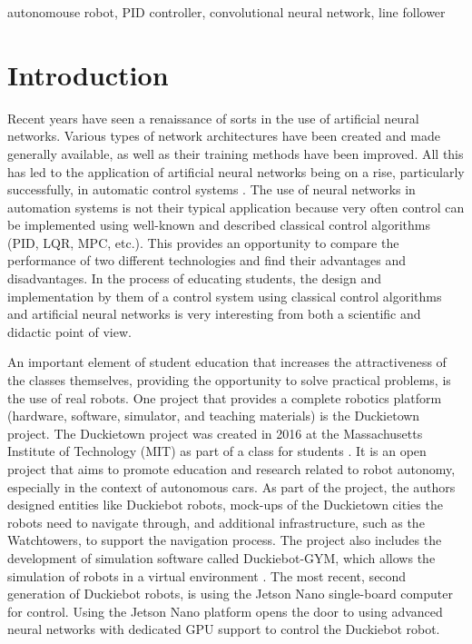 \documentclass[conference]{IEEEtran}
\begin{document}
\begin{IEEEkeywords}
autonomouse robot, PID controller, convolutional neural network, line follower
\end{IEEEkeywords}
%
\section{Introduction}
Recent years have seen a renaissance of sorts in the use of artificial neural networks. Various types of network architectures have been created and made generally available, as well as their training methods have been improved. All this has led to the application of artificial neural networks being on a rise, particularly successfully, in automatic control systems \cite{algor2030973, 786109}. The use of neural networks in automation systems is not their typical application because very often control can be implemented using well-known and described classical control algorithms (PID, LQR, MPC, etc.). This provides an opportunity to compare the performance of two different technologies and find their advantages and disadvantages. In the process of educating students, the design and implementation by them of a control system using classical control algorithms and artificial neural networks is very interesting from both a scientific and didactic point of view.

An important element of student education that increases the attractiveness of the classes themselves, providing the opportunity to solve practical problems, is the use of real robots. One project that provides a complete robotics platform (hardware, software, simulator, and teaching materials) is the Duckietown project.
The Duckietown project was created in 2016 at the Massachusetts Institute of Technology (MIT) as part of a class for students \cite{paull2017duckietown}. It is an open project that aims to promote education and research related to robot autonomy, especially in the context of autonomous cars. As part of the project, the authors designed entities like Duckiebot robots, mock-ups of the Duckietown cities the robots need to navigate through, and additional infrastructure, such as the Watchtowers, to support the navigation process.
The project also includes the development of simulation software called Duckiebot-GYM, which allows the simulation of robots in a virtual environment \cite{gym_duckietown}. The most recent, second generation of Duckiebot robots, is using the Jetson Nano single-board computer for control. Using the Jetson Nano platform opens the door to using advanced neural networks with dedicated GPU support to control the Duckiebot robot.
\end{document}
